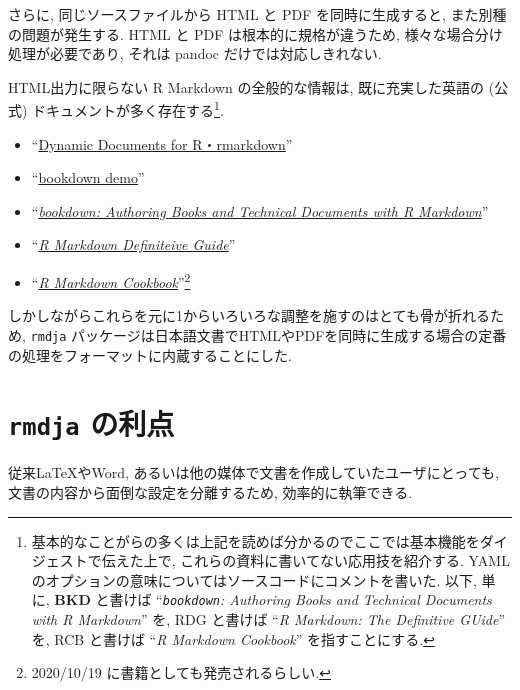 \documentclass[
  xelatex,ja=standard,jafont=noto]{bxjsbook}
\providecommand{\tightlist}{%
  \setlength{\itemsep}{0pt}\setlength{\parskip}{0pt}}
\theoremstyle{definition}
\theoremstyle{definition}
\theoremstyle{definition}
\theoremstyle{definition}
\theoremstyle{remark}
\begin{document}
さらに, 同じソースファイルから HTML と PDF を同時に生成すると,
また別種の問題が発生する. HTML と PDF は根本的に規格が違うため,
様々な場合分け処理が必要であり, それは pandoc だけでは対応しきれない.

HTML出力に限らない R Markdown の全般的な情報は, 既に充実した英語の
(公式) ドキュメントが多く存在する\footnote{基本的なことがらの多くは上記を読めば分かるのでここでは基本機能をダイジェストで伝えた上で,
  これらの資料に書いてない応用技を紹介する. YAML
  のオプションの意味についてはソースコードにコメントを書いた. 以下,
  単に, \textbf{BKD} と書けば ``\emph{\texttt{bookdown}: Authoring Books
  and Technical Documents with R Markdown}'' \citep{R-bookdown} を, RDG
  と書けば ``\emph{R Markdown: The Definitive GUide}''
  \citep{rmarkdown2018} を, RCB と書けば ``\emph{R Markdown Cookbook}''
  \citep{xie2020Markdown} を指すことにする.}.

\begin{itemize}
\tightlist
\item
  ``\href{https://rmarkdown.rstudio.com/docs/index.html}{Dynamic
  Documents for R・rmarkdown}''
\item
  ``\href{https://github.com/rstudio/bookdown-demo}{bookdown demo}''
\item
  ``\href{https://bookdown.org/yihui/bookdown/}{\emph{bookdown:
  Authoring Books and Technical Documents with R Markdown}}''
\item
  ``\href{https://bookdown.org/yihui/rmarkdown/}{\emph{R Markdown
  Definiteive Guide}}''
\item
  ``\href{https://bookdown.org/yihui/rmarkdown-cookbook}{\emph{R
  Markdown Cookbook}}''\footnote{2020/10/19
    に書籍としても発売されるらしい.}
\end{itemize}

しかしながらこれらを元に1からいろいろな調整を施すのはとても骨が折れるため,
\texttt{rmdja}
パッケージは日本語文書でHTMLやPDFを同時に生成する場合の定番の処理をフォーマットに内蔵することにした.

\hypertarget{rmdja-ux306eux5229ux70b9}{%
\section*{\texorpdfstring{\texttt{rmdja}
の利点}{rmdja の利点}}\label{rmdja-ux306eux5229ux70b9}}

従来LaTeXやWord, あるいは他の媒体で文書を作成していたユーザにとっても,
文書の内容から面倒な設定を分離するため, 効率的に執筆できる.
\end{document}
